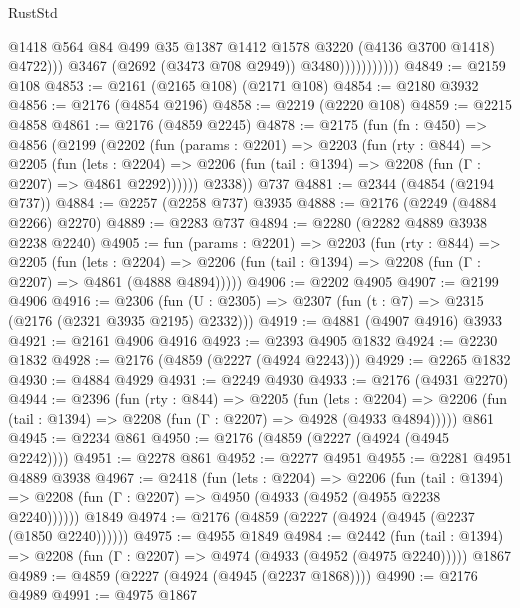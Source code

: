 \begin{lexlean}{RustStd}
\begin{coremodule}
                                @1418
                                @564
                                @84
                                @499
                                @35
                                @1387
                                @1412
                                @1578
                                @3220
                                (@4136 @3700 @1418)
                                @4722)))
                          @3467
                          (@2692 (@3473 @708 @2949))
                          @3480)))))))))))
@4849 := @2159 @108
@4853 := @2161 (@2165 @108) (@2171 @108)
@4854 := @2180 @3932
@4856 := @2176 (@4854 @2196)
@4858 := @2219 (@2220 @108)
@4859 := @2215 @4858
@4861 := @2176 (@4859 @2245)
@4878 := @2175
    (fun (fn : @450) =>
    @4856
      (@2199
        (@2202
          (fun (params : @2201) =>
          @2203
            (fun (rty : @844) =>
            @2205
              (fun (lets : @2204) =>
              @2206 (fun (tail : @1394) => @2208 (fun (Γ : @2207) => @4861 @2292))))))
        @2338))
    @737
@4881 := @2344 (@4854 (@2194 @737))
@4884 := @2257 (@2258 @737) @3935
@4888 := @2176 (@2249 (@4884 @2266) @2270)
@4889 := @2283 @737
@4894 := @2280 (@2282 @4889 @3938 @2238 @2240)
@4905 := fun (params : @2201) =>
  @2203
    (fun (rty : @844) =>
    @2205
      (fun (lets : @2204) =>
      @2206 (fun (tail : @1394) => @2208 (fun (Γ : @2207) => @4861 (@4888 @4894)))))
@4906 := @2202 @4905
@4907 := @2199 @4906
@4916 := @2306 (fun (U : @2305) => @2307 (fun (t : @7) => @2315 (@2176 (@2321 @3935 @2195) @2332)))
@4919 := @4881 (@4907 @4916) @3933
@4921 := @2161 @4906 @4916
@4923 := @2393 @4905 @1832
@4924 := @2230 @1832
@4928 := @2176 (@4859 (@2227 (@4924 @2243)))
@4929 := @2265 @1832
@4930 := @4884 @4929
@4931 := @2249 @4930
@4933 := @2176 (@4931 @2270)
@4944 := @2396
    (fun (rty : @844) =>
    @2205
      (fun (lets : @2204) =>
      @2206 (fun (tail : @1394) => @2208 (fun (Γ : @2207) => @4928 (@4933 @4894)))))
    @861
@4945 := @2234 @861
@4950 := @2176 (@4859 (@2227 (@4924 (@4945 @2242))))
@4951 := @2278 @861
@4952 := @2277 @4951
@4955 := @2281 @4951 @4889 @3938
@4967 := @2418
    (fun (lets : @2204) =>
    @2206
      (fun (tail : @1394) => @2208 (fun (Γ : @2207) => @4950 (@4933 (@4952 (@4955 @2238 @2240))))))
    @1849
@4974 := @2176 (@4859 (@2227 (@4924 (@4945 (@2237 (@1850 @2240))))))
@4975 := @4955 @1849
@4984 := @2442
    (fun (tail : @1394) => @2208 (fun (Γ : @2207) => @4974 (@4933 (@4952 (@4975 @2240)))))
    @1867
@4989 := @4859 (@2227 (@4924 (@4945 (@2237 @1868))))
@4990 := @2176 @4989
@4991 := @4975 @1867

\end{coremodule}
\end{lexlean}
